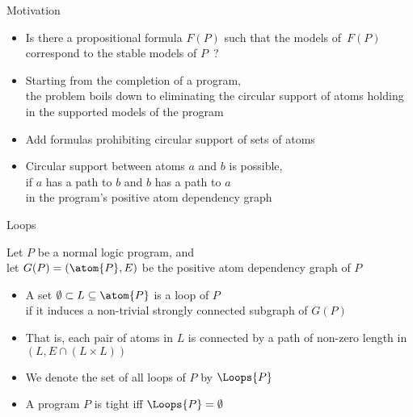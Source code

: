 \begin{frame}[c]{Motivation}
  \begin{itemize}
  \item<1-> 
    Is there a propositional formula $F(P)$ such that the models of~$F(P)$ correspond to the
    stable models of $P$~?
    \bigskip
  \item<2-> 
    Starting from the completion of a program,\\
    the problem boils down to eliminating the circular support of atoms
    holding in the supported models of the program
    \medskip
  \item<3-> 
    Add formulas prohibiting circular support of sets of atoms
  \item<4-> 
    Circular support between atoms $a$ and $b$ is possible,\\
    if $a$ has a path to $b$ and $b$ has a path to $a$\\
    in the program's positive atom dependency graph
  \end{itemize}
\end{frame}
\begin{frame}{Loops}

Let $P$ be a normal logic program, and\\
let $G(P) = (\atom{P},E)$ be the positive atom dependency graph of $P$

\begin{itemize}
\item<2-> A set $\emptyset\subset L \subseteq \atom{P}$ is a \alert{loop} of $P$\\
  if it induces a non-trivial strongly connected subgraph of $G(P)$
\item<3->[] That is, each pair of atoms in $L$ is connected by a path of non-zero length in
  $(L,E\cap(L \times L))$
  \bigskip
\item<4-> We denote the set of all loops of $P$ by $\Loops{P}$
  \medskip
\item<5->  A program $P$ is tight iff $\Loops{P}=\emptyset$
\end{itemize}
\end{frame}
